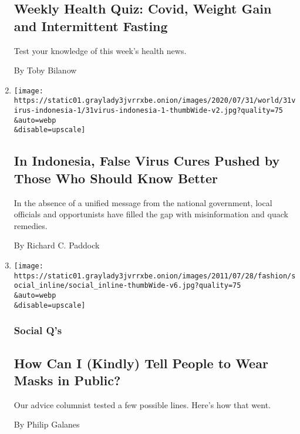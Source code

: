 \begin{enumerate}
  \hypertarget{weekly-health-quiz-covid-weight-gain-and-intermittent-fasting-1}{%
  \subsection{Weekly Health Quiz: Covid, Weight Gain and Intermittent
  Fasting}\label{weekly-health-quiz-covid-weight-gain-and-intermittent-fasting-1}}

  Test your knowledge of this week's health news.

  By Toby Bilanow
\item
  \href{/2020/07/31/world/asia/indonesia-coronavirus.html}{}

  \texttt{[image: https://static01.graylady3jvrrxbe.onion/images/2020/07/31/world/31virus-indonesia-1/31virus-indonesia-1-thumbWide-v2.jpg?quality=75\\\&auto=webp\\\&disable=upscale]}

  \hypertarget{in-indonesia-false-virus-cures-pushed-by-those-who-should-know-better}{%
  \subsection{In Indonesia, False Virus Cures Pushed by Those Who Should
  Know
  Better}\label{in-indonesia-false-virus-cures-pushed-by-those-who-should-know-better}}

  In the absence of a unified message from the national government,
  local officials and opportunists have filled the gap with
  misinformation and quack remedies.

  By Richard C. Paddock
\item
  \href{/2020/07/30/style/masks-in-public-coronavirus.html}{}

  \texttt{[image: https://static01.graylady3jvrrxbe.onion/images/2011/07/28/fashion/social\_inline/social\_inline-thumbWide-v6.jpg?quality=75\\\&auto=webp\\\&disable=upscale]}

  \hypertarget{social-qs}{%
  \subsubsection{Social Q's}\label{social-qs}}

  \hypertarget{how-can-i-kindly-tell-people-to-wear-masks-in-public}{%
  \subsection{How Can I (Kindly) Tell People to Wear Masks in
  Public?}\label{how-can-i-kindly-tell-people-to-wear-masks-in-public}}

  Our advice columnist tested a few possible lines. Here's how that
  went.

  By Philip Galanes
\end{enumerate}

